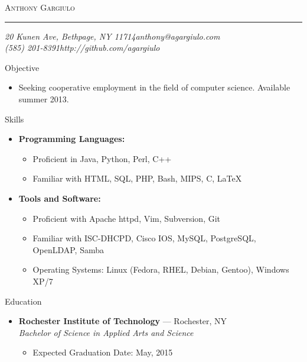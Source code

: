 \documentclass[10pt,oneside]{article}
\makeatletter
\newcommand{\name}{Anthony Gargiulo}
\newcommand{\addr}{20 Kunen Ave, Bethpage, NY 11714}
\newcommand{\phone}{(585) 201-8391}
\newcommand{\email}{anthony@agargiulo.com}
\newcommand{\github}{http://github.com/agargiulo}
\newcommand{\bigname}[1]{
	\begin{center}\fontfamily{ppl}\selectfont\Huge\scshape#1\end{center}
}
\newenvironment{ressection}[1]{
	\vspace{3pt}
	{\fontfamily{ppl}\selectfont\Large#1}
	\begin{itemize}
	\vspace{2pt}
}{
	\end{itemize}
}
\newcommand{\resitem}[1]{
	\vspace{-2pt}
	\item \begin{flushleft} #1 \end{flushleft}
}
\newcommand{\ressubitem}[1]{
	\vspace{-1pt}
	\item \begin{flushleft} #1 \end{flushleft}
}
\newcommand{\resbigitem}[3]{
	\vspace{-3pt}
	\item
	\textbf{#1} --- #2 \\
	\textit{#3}
}
\newenvironment{ressubsec}[3]{
	\resbigitem{#1}{#2}{#3}
	\vspace{-1pt}
	\begin{itemize}
}{
	\end{itemize}
}
\newenvironment{reslist}[1]{
	\resitem{\textbf{#1}}
	\vspace{-3pt}
	\begin{itemize}
}{
	\end{itemize}
}
\makeatother
\begin{document}
 \selectfont

\bigname{\name}

\vspace{-4pt} \rule{\textwidth}{1pt}

\vspace{-1pt} {\normalsize\itshape \addr \hfill \email \\ \phone \hfill \github}

\vspace{15 pt}



\begin{ressection}{Objective}

	\ressubitem{Seeking cooperative employment in the field of computer science. Available summer 2013.}

\end{ressection}
\begin{ressection}{Skills}


	\begin{reslist}{Programming Languages:}
		\ressubitem{Proficient in Java, Python, Perl, C++}
		\ressubitem{Familiar with HTML, SQL, PHP, Bash, MIPS, C, \LaTeX}
	\end{reslist}

	\begin{reslist}{Tools and Software:}
		\ressubitem{Proficient with Apache httpd, Vim, Subversion, Git}
		\ressubitem{Familiar with ISC-DHCPD, Cisco IOS, MySQL, PostgreSQL, OpenLDAP, Samba}
		\ressubitem{Operating Systems: Linux (Fedora, RHEL, Debian, Gentoo), Windows XP/7}
	\end{reslist}

\end{ressection}

\begin{ressection}{Education}

	\begin{ressubsec}{Rochester Institute of Technology}{Rochester, NY}{Bachelor of Science in Applied Arts and Science}
		\ressubitem{Expected Graduation Date: May, 2015}
	\end{ressubsec}

\end{ressection}
\end{document}
